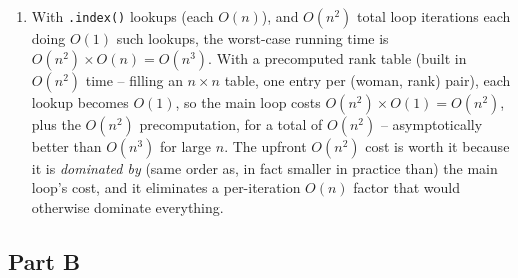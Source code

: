 \documentclass[11pt]{article}
\begin{document}
\begin{enumerate}[label=\textbf{A\arabic*.}, leftmargin=2.2em]
\item With \texttt{.index()} lookups (each $O(n)$), and $O(n^2)$ total loop iterations
each doing $O(1)$ such lookups, the worst-case running time is $O(n^2) \times O(n) =
O(n^3)$. With a precomputed rank table (built in $O(n^2)$ time -- filling an $n \times n$
table, one entry per (woman, rank) pair), each lookup becomes $O(1)$, so the main loop
costs $O(n^2) \times O(1) = O(n^2)$, plus the $O(n^2)$ precomputation, for a total of
$O(n^2)$ -- asymptotically better than $O(n^3)$ for large $n$. The upfront $O(n^2)$ cost is
worth it because it is \emph{dominated by} (same order as, in fact smaller in practice
than) the main loop's cost, and it eliminates a per-iteration $O(n)$ factor that would
otherwise dominate everything.

\end{enumerate}

\subsection*{Part B}
\end{document}
